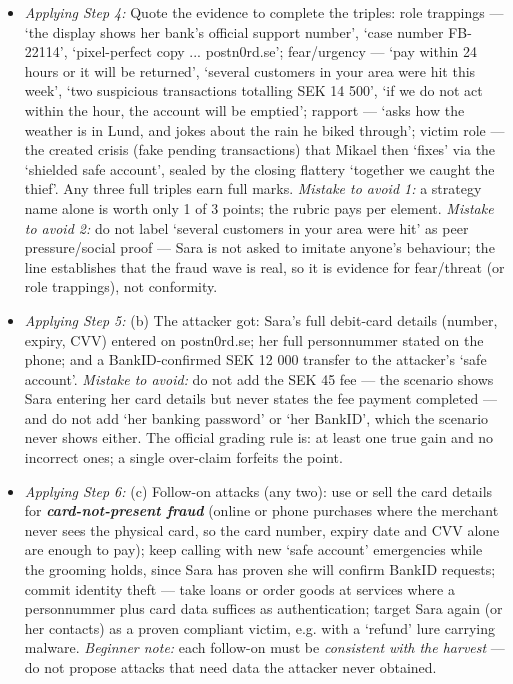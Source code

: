 \documentclass[12pt, a4paper]{article}
\newcommand{\term}[1]{\textbf{\textit{#1}}}        %
\begin{document}
\begin{itemize}
    \item \textit{Applying Step 4:} Quote the evidence to complete the triples: role trappings --- `the display shows her bank's official support number', `case number FB-22114', `pixel-perfect copy ... postn0rd.se'; fear/urgency --- `pay within 24 hours or it will be returned', `several customers in your area were hit this week', `two suspicious transactions totalling SEK 14 500', `if we do not act within the hour, the account will be emptied'; rapport --- `asks how the weather is in Lund, and jokes about the rain he biked through'; victim role --- the created crisis (fake pending transactions) that Mikael then `fixes' via the `shielded safe account', sealed by the closing flattery `together we caught the thief'. Any three full triples earn full marks. \emph{Mistake to avoid 1:} a strategy name alone is worth only 1 of 3 points; the rubric pays per element. \emph{Mistake to avoid 2:} do not label `several customers in your area were hit' as peer pressure/social proof --- Sara is not asked to imitate anyone's behaviour; the line establishes that the fraud wave is real, so it is evidence for fear/threat (or role trappings), not conformity.
    \item \textit{Applying Step 5:} (b) The attacker got: Sara's full debit-card details (number, expiry, CVV) entered on postn0rd.se; her full personnummer stated on the phone; and a BankID-confirmed SEK 12 000 transfer to the attacker's `safe account'. \emph{Mistake to avoid:} do not add the SEK 45 fee --- the scenario shows Sara entering her card details but never states the fee payment completed --- and do not add `her banking password' or `her BankID', which the scenario never shows either. The official grading rule is: at least one true gain and no incorrect ones; a single over-claim forfeits the point.
    \item \textit{Applying Step 6:} (c) Follow-on attacks (any two): use or sell the card details for \term{card-not-present fraud} (online or phone purchases where the merchant never sees the physical card, so the card number, expiry date and CVV alone are enough to pay); keep calling with new `safe account' emergencies while the grooming holds, since Sara has proven she will confirm BankID requests; commit identity theft --- take loans or order goods at services where a personnummer plus card data suffices as authentication; target Sara again (or her contacts) as a proven compliant victim, e.g. with a `refund' lure carrying malware. \emph{Beginner note:} each follow-on must be \emph{consistent with the harvest} --- do not propose attacks that need data the attacker never obtained.
\end{itemize}
\end{document}
